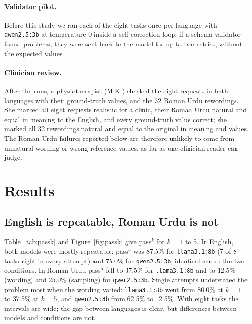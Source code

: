 \documentclass[11pt,a4paper]{article}
\newcommand{\code}[1]{\texttt{#1}}
\newcommand{\passk}[1]{pass$^{#1}$}
\begin{document}
\paragraph{Validator pilot.} Before this study we ran each of the eight tasks once per language with
\code{qwen2.5:3b} at temperature 0 inside a self-correction loop: if a schema validator found problems, they were
sent back to the model for up to two retries, without the expected values.

\paragraph{Clinician review.} After the runs, a physiotherapist (M.K.) checked the eight requests in both languages with their ground-truth values, and the 32 Roman Urdu rewordings. She marked all eight requests realistic for a clinic, their Roman Urdu natural and equal in meaning to the English, and every ground-truth value correct; she marked all 32 rewordings natural and equal to the original in meaning and values. The Roman Urdu failures reported below are therefore unlikely to come from unnatural wording or wrong reference values, as far as one clinician reader can judge.

\section{Results}

\subsection{English is repeatable, Roman Urdu is not}

Table~\ref{tab:passk} and Figure~\ref{fig:passk} give \passk{k} for $k=1$ to 5. In English, both models were mostly
repeatable: \passk{5} was 87.5\% for \code{llama3.1:8b} (7 of 8 tasks right in every attempt) and 75.0\% for
\code{qwen2.5:3b}, identical across the two conditions. In Roman Urdu \passk{5} fell to 37.5\% for
\code{llama3.1:8b} and to 12.5\% (wording) and 25.0\% (sampling) for \code{qwen2.5:3b}. Single attempts understated
the problem most when the wording varied: \code{llama3.1:8b} went from 80.0\% at $k=1$ to 37.5\% at $k=5$, and
\code{qwen2.5:3b} from 62.5\% to 12.5\%. With eight tasks the intervals are wide; the gap between languages is
clear, but differences between models and conditions are not.
\end{document}
